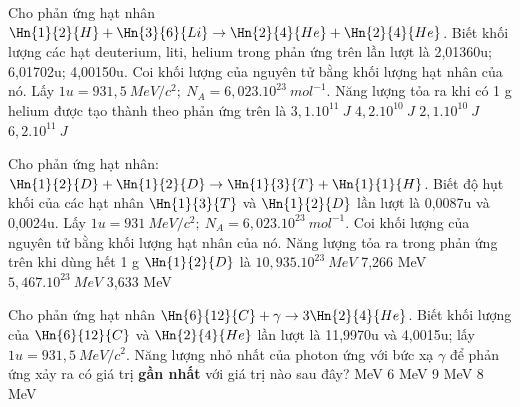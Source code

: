 \begin{vidu}%
 Cho phản ứng hạt nhân $\Hn{1}{2}{H} +\Hn{3}{6}{Li} \rightarrow \Hn{2}{4}{He} +\Hn{2}{4}{He}$. Biết khối lượng các hạt deuterium, liti, helium trong phản ứng trên lần lượt là 2,01360u; 6,01702u; 4,00150u. Coi khối lượng của nguyên tử bằng khối lượng hạt nhân của nó. Lấy $1u=931,5\ MeV/c^2;\ N_A=6,{023.10}^{23}\ mo{l}^{- 1}$. Năng lượng tỏa ra khi có 1 g helium được tạo thành theo phản ứng trên là
\choice
{\True $3,1.10^ {11}\ J$}
{$4,2.10^ {10}\ J$}
{$2,1.10^ {10}\ J$}
{$6,2.10^ {11}\ J$}
\end{vidu}
\begin{vidu}%
Cho phản ứng hạt nhân: $\Hn{1}{2}{D}+\Hn{1}{2}{D}\to \Hn{1}{3}{T}+\Hn{1}{1}{H}$. Biết độ hụt khối của các hạt nhân $\Hn{1}{3}{T}$ và $\Hn{1}{2}{D}$ lần lượt là 0,0087u và 0,0024u. Lấy $1u=931\ MeV/c^2;\ N_A=6,{023.10}^{23}\ mo{l}^{- 1}$. Coi khối lượng của nguyên tử bằng khối lượng hạt nhân của nó. Năng lượng tỏa ra trong phản ứng trên khi dùng hết 1 g $\Hn{1}{2}{D}$ là
\choice
{$10,935.10^{23}\ MeV$}
{7,266 MeV}
{\True $5,467.10^{23}\ MeV$}
{3,633 MeV}
\end{vidu}
\begin{vidu}%
 Cho phản ứng hạt nhân $\Hn{6}{12}{C}+\gamma \rightarrow 3\Hn{2}{4}{He}$. Biết khối lượng của $\Hn{6}{12}{C}$ và $\Hn{2}{4}{He}$ lần lượt là 11,9970u và 4,0015u; lấy $1u = 931,5 \ MeV/c^2$. Năng lượng nhỏ nhất của photon ứng với bức xạ $\gamma$ để phản ứng xảy ra có giá trị \textbf{gần nhất} với giá trị nào sau đây?
\choice
{ MeV}
{6 MeV}
{9 MeV}
{8 MeV}
\end{vidu}










